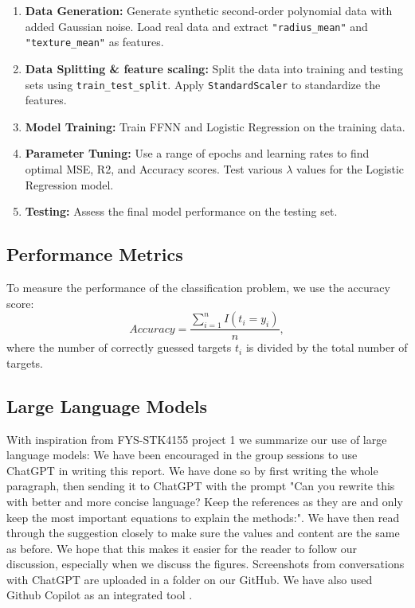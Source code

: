\begin{enumerate}
    \item \textbf{Data Generation:} Generate synthetic second-order polynomial data with added Gaussian noise. Load real data and extract \texttt{"radius\_mean"} and \texttt{"texture\_mean"} as features. 
    \item \textbf{Data Splitting \& feature scaling:} Split the data into training and testing sets using \texttt{train\_test\_split}. Apply \texttt{StandardScaler} to standardize the features.
    \item \textbf{Model Training:} Train FFNN and Logistic Regression on the training data.
    \item \textbf{Parameter Tuning:} Use a range of epochs and learning rates to find optimal MSE, R2, and Accuracy scores. Test various $\lambda$ values for the Logistic Regression model.
    \item \textbf{Testing:} Assess the final model performance on the testing set.
\end{enumerate}


\subsection{Performance Metrics}

To measure the performance of the classification problem, we use the accuracy score: \begin{equation}
    Accuracy = \frac{\sum_{i=1}^n I(t_i = y_i)}{n},
\end{equation}
where the number of correctly guessed targets $t_i$ is divided by the total number of targets.


\subsection{Large Language Models}

With inspiration from FYS-STK4155 project 1 \cite{bore2023fysstk4155project1} we summarize our use of large language models: 
We have been encouraged in the group sessions to use ChatGPT \cite{openai2023chatgpt} in writing this report. We have done so by first writing the whole paragraph, then sending it to ChatGPT with the prompt "Can you rewrite this with better and more concise language? Keep the references as they are and only keep the most important equations to explain the methods:". We have then read through the suggestion closely to make sure the values and content are the same as before. We hope that this makes it easier for the reader to follow our discussion, especially when we discuss the figures. Screenshots from conversations with ChatGPT are uploaded in a folder on our GitHub. We
have also used Github Copilot as an integrated tool \cite{github_copilot}.


